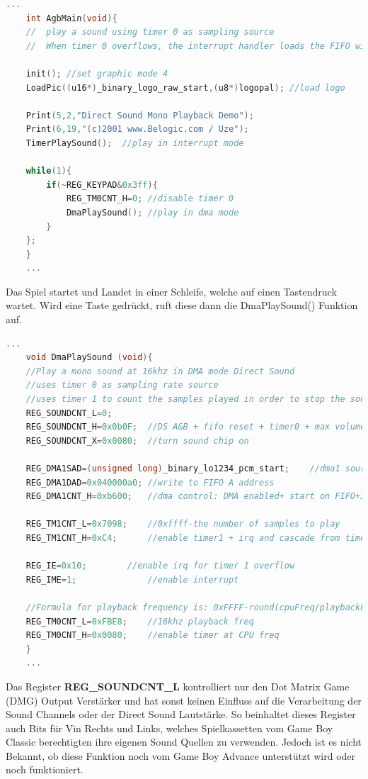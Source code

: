 \documentclass[11pt,a4paper]{scrartcl}
\begin{document}
\vspace{5mm}
\begin{lstlisting}[language=C++, caption={Belogic Direct Sound Demo}, label={list:directsound1}]
    ...
	int AgbMain(void){
	//	play a sound using timer 0 as sampling source
	//	When timer 0 overflows, the interrupt handler loads the FIFO with the next sample
	
	init(); //set graphic mode 4
	LoadPic((u16*)_binary_logo_raw_start,(u8*)logopal); //load logo

	Print(5,2,"Direct Sound Mono Playback Demo");
	Print(6,19,"(c)2001 www.Belogic.com / Uze");
	TimerPlaySound();  //play in interrupt mode

	while(1){
		if(~REG_KEYPAD&0x3ff){
			REG_TM0CNT_H=0;	//disable timer 0
			DmaPlaySound(); //play in dma mode
		}
	};
	}
	...
\end{lstlisting}

Das Spiel startet und Landet in einer Schleife, welche auf einen Tastendruck wartet. Wird eine Taste gedr\"uckt, ruft diese dann die DmaPlaySound() Funktion auf.

\vspace{5mm}
\begin{lstlisting}[language=C++, caption={Belogic DmaPlaySound()}, label={list:directsound2}]
    ...
	void DmaPlaySound (void){
	//Play a mono sound at 16khz in DMA mode Direct Sound
	//uses timer 0 as sampling rate source
	//uses timer 1 to count the samples played in order to stop the sound 
	REG_SOUNDCNT_L=0;
	REG_SOUNDCNT_H=0x0b0F;  //DS A&B + fifo reset + timer0 + max volume to L and R
	REG_SOUNDCNT_X=0x0080;  //turn sound chip on
	
	REG_DMA1SAD=(unsigned long)_binary_lo1234_pcm_start;	//dma1 source
	REG_DMA1DAD=0x040000a0; //write to FIFO A address
	REG_DMA1CNT_H=0xb600;	//dma control: DMA enabled+ start on FIFO+32bit+repeat
	
	REG_TM1CNT_L=0x7098;	//0xffff-the number of samples to play
	REG_TM1CNT_H=0xC4;		//enable timer1 + irq and cascade from timer 0

	REG_IE=0x10;	  	//enable irq for timer 1 overflow
	REG_IME=1;				//enable interrupt
	
	//Formula for playback frequency is: 0xFFFF-round(cpuFreq/playbackFreq)
	REG_TM0CNT_L=0xFBE8;	//16khz playback freq
	REG_TM0CNT_H=0x0080; 	//enable timer at CPU freq 
	}
	...
\end{lstlisting}
\newpage

Das Register \textbf{REG\_SOUNDCNT\_L} kontrolliert nur den Dot Matrix Game (DMG) Output Verst\"arker und hat sonst keinen Einfluss auf die Verarbeitung der Sound Channels oder der Direct Sound Lautst\"arke. So beinhaltet dieses Register auch Bits f\"ur Vin Rechts und Links, welches Spielkassetten vom Game Boy Classic berechtigten ihre eigenen Sound Quellen zu verwenden. Jedoch ist es nicht Bekannt, ob diese Funktion noch vom Game Boy Advance unterst\"utzt wird oder noch funktioniert.
\end{document}
